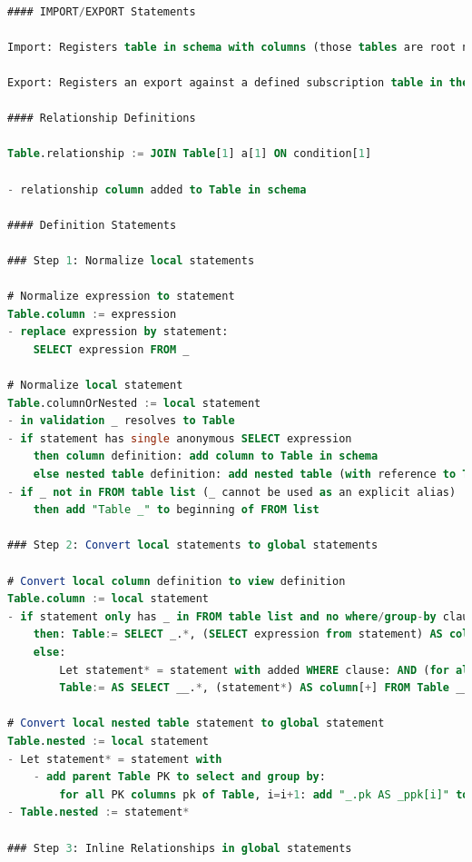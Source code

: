 \documentclass[	DIV=calc,%
							paper=letter,%
							fontsize=11pt,%
							twocolumn]{scrartcl}	 					%
\begin{document}
\begin{lstlisting}[language=SQL]

#### IMPORT/EXPORT Statements

Import: Registers table in schema with columns (those tables are root nodes in the logical plan DAG)

Export: Registers an export against a defined subscription table in the schema

#### Relationship Definitions

Table.relationship := JOIN Table[1] a[1] ON condition[1]

- relationship column added to Table in schema

#### Definition Statements

### Step 1: Normalize local statements

# Normalize expression to statement
Table.column := expression
- replace expression by statement:
    SELECT expression FROM _

# Normalize local statement
Table.columnOrNested := local statement
- in validation _ resolves to Table
- if statement has single anonymous SELECT expression
    then column definition: add column to Table in schema
    else nested table definition: add nested table (with reference to Table) to schema with parent and child relationship columns and PK = Table PK + local PK for nested table (see below)
- if _ not in FROM table list (_ cannot be used as an explicit alias)
    then add "Table _" to beginning of FROM list

### Step 2: Convert local statements to global statements

# Convert local column definition to view definition
Table.column := local statement
- if statement only has _ in FROM table list and no where/group-by clause
    then: Table:= SELECT _.*, (SELECT expression from statement) AS column[+] FROM Table _
    else:
        Let statement* = statement with added WHERE clause: AND (for all PK columns pk of Table: _.pk = __.pk)
        Table:= AS SELECT __.*, (statement*) AS column[+] FROM Table __

# Convert local nested table statement to global statement
Table.nested := local statement
- Let statement* = statement with
    - add parent Table PK to select and group by:
        for all PK columns pk of Table, i=i+1: add "_.pk AS _ppk[i]" to SELECT and "_.pk" to GROUP BY
- Table.nested := statement*

### Step 3: Inline Relationships in global statements


\end{lstlisting}
\end{document}
